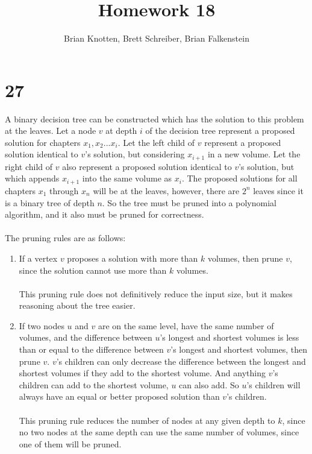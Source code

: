 \documentclass[letterpaper,notitlepage,twoside]{article}
\begin{document}
\title{Homework 18}
\author{Brian Knotten, Brett Schreiber, Brian Falkenstein}
\maketitle

\section*{27}
A binary decision tree can be constructed which has the solution to this
problem at the leaves. Let a node $v$ at depth $i$ of the decision tree
represent a proposed solution for chapters $x_1, x_2... x_i$. Let the left
child of $v$ represent a proposed solution identical to $v$'s solution, but
considering $x_{i + 1}$ in a new volume. Let the right child of $v$ also
represent a proposed solution identical to $v$'s solution, but which appends
$x_{i + 1}$ into the same volume as $x_i$. The proposed solutions for all
chapters $x_1$ through $x_n$ will be at the leaves, however, there are $2^n$
leaves since it is a binary tree of depth $n$. So the tree must be pruned into
a polynomial algorithm, and it also must be pruned for correctness.
\\\\
The pruning rules are as follows:
\begin{enumerate}
    \item If a vertex $v$ proposes a solution with more than $k$ volumes,
        then prune $v$, since the solution cannot use more than $k$ volumes.
        \\\\
        This pruning rule does not definitively reduce the input size, but it
        makes reasoning about the tree easier.

    \item If two nodes $u$ and $v$ are on the same level, have the same
        number of volumes, and the difference between $u$'s longest and
        shortest volumes is less than or equal to the difference between $v$'s
        longest and shortest volumes, then prune $v$. $v$'s children can only
        decrease the difference between the longest and shortest volumes if
        they add to the shortest volume. And anything $v$'s children can add
        to the shortest volume, $u$ can also add. So $u$'s children will always
        have an equal or better proposed solution than $v$'s children.
        \\\\
        This pruning rule reduces the number of nodes at any given depth to $k$,
        since no two nodes at the same depth can use the same number of volumes,
        since one of them will be pruned.
\end{enumerate}
\end{document}
